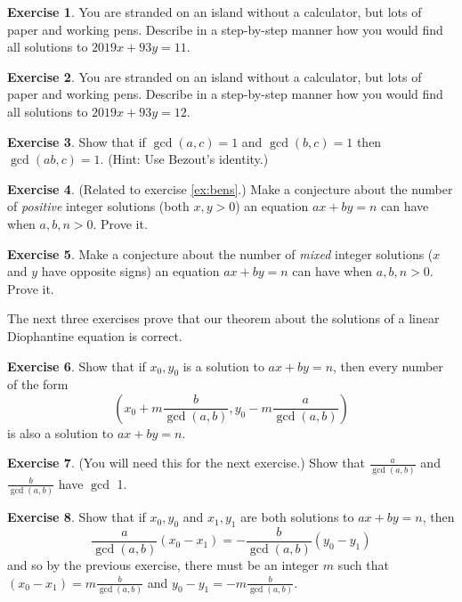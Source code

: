 \documentclass[11pt]{article}
\theoremstyle{definition}
\newtheorem{exercise}{Exercise}
\numberwithin{thm}{section}
\begin{document}
\begin{exercise} You are stranded on an island without a calculator, but lots of paper and working pens. Describe in a step-by-step manner how you would find all solutions to $2019x + 93y = 11$.
\end{exercise}

\begin{exercise} You are stranded on an island without a calculator, but lots of paper and working pens. Describe in a step-by-step manner how you would find all solutions to $2019x + 93y = 12$.
\end{exercise}

\begin{exercise} Show that if $\gcd(a,c)=1$ and $\gcd(b,c)=1$ then $\gcd(ab,c) = 1$. (Hint: Use Bezout's identity.)
\end{exercise}

\begin{exercise} (Related to exercise \ref{ex:bens}.) Make a conjecture about the number of \textit{positive} integer solutions (both $x,y>0$) an equation $ax+by=n$ can have when $a,b,n >0$. Prove it. 
\end{exercise}

\begin{exercise} Make a conjecture about the number of \textit{mixed} integer solutions ($x$ and $y$ have opposite signs) an equation $ax+by=n$ can have when $a,b,n >0$. Prove it. 
\end{exercise}

The next three exercises prove that our theorem about the solutions of a linear Diophantine equation is correct.

\begin{exercise} Show that if $x_0, y_0$ is a solution to $ax+by=n$, then every number of the form
\[
	\left(x_0 + m\frac{b}{\gcd(a,b)}, y_0 - m\frac{a}{\gcd(a,b)} \right)
\]
is also a solution to $ax+by=n$.
\end{exercise}

\begin{exercise} (You will need this for the next exercise.) Show that $\frac{a}{\gcd(a,b)}$ and $\frac{b}{\gcd(a,b)}$ have $\gcd$ 1.
\end{exercise}

\begin{exercise} Show that if $x_0, y_0$ and $x_1, y_1$ are both solutions to $ax+by=n$, then
\[
	\frac{a}{\gcd(a,b)}(x_0 - x_1) = -\frac{b}{\gcd(a,b)}(y_0 - y_1)
\]
and so by the previous exercise, there must be an integer $m$ such that $(x_0 - x_1) = m \frac{b}{\gcd(a,b)}$ and $y_0-y_1 = -m \frac{b}{\gcd(a,b)}$.
\end{exercise}
\end{document}
